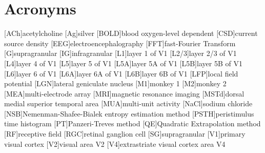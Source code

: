     \chapter*{Acronyms}
    \begin{acronym}[BOLD]
        [ACh]{acetylcholine}
        [Ag]{silver}
        [BOLD]{blood oxygen-level dependent}
        [CSD]{current source density}
        [EEG]{electroencephalography}
        [FFT]{fast-Fourier Transform}
        [G]{supragranular}
        [IG]{infragranular}
        [L1]{layer 1 of \ac{V1}}
        [L2/3]{layer 2/3 of \ac{V1}}
        [L4]{layer 4 of \ac{V1}}
        [L5]{layer 5 of \ac{V1}}
        [L5A]{layer 5A of \ac{V1}}
        [L5B]{layer 5B of \ac{V1}}
        [L6]{layer 6 of \ac{V1}}
        [L6A]{layer 6A of \ac{V1}}
        [L6B]{layer 6B of \ac{V1}}
        [LFP]{local field potential}
        [LGN]{lateral geniculate nucleus}
        [M1]{monkey 1}
        [M2]{monkey 2}
        [MEA]{multi-electrode array}
        [MRI]{magnetic resonance imaging}
        [MSTd]{dorsal medial superior temporal area}
        [MUA]{multi-unit activity}
        [NaCl]{sodium chloride}
        [NSB]{{N}emenman-{S}hafee-{B}ialek entropy estimation method}
        [PSTH]{peristimulus time histogram}
        [PT]{{P}anzeri-{T}reves method}
        [QE]{Quadratic Extrapolation method}
        [RF]{receptive field}
        [RGC]{retinal ganglion cell}
        [SG]{supragranular}
        [V1]{primary visual cortex}
        [V2]{visual area {V2}}
        [V4]{extrastriate visual cortex area {V4}}
    \end{acronym}                     
\endgroup
